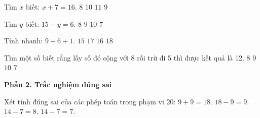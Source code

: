 \begin{ex} %
Tìm $x$ biết: $x + 7 = 16$.
\choice
{$8$}
{$10$}
{$11$}
{\True $9$}
\end{ex}

\begin{ex} %
Tìm $y$ biết: $15 - y = 6$.
\choice
{$8$}
{\True $9$}
{$10$}
{$7$}
\end{ex}

\begin{ex} %
Tính nhanh: $9 + 6 + 1$.
\choice
{$15$}
{$17$}
{\True $16$}
{$18$}
\end{ex}

\begin{ex} %
Tìm một số biết rằng lấy số đó cộng với 8 rồi trừ đi 5 thì được kết quả là 12.
\choice
{$8$}
{\True $9$}
{$10$}
{$7$}
\end{ex}

\textbf{Phần 2. Trắc nghiệm đúng sai}

\begin{ex} %
Xét tính đúng sai của các phép toán trong phạm vi 20:
\choiceTF
{\True $9 + 9 = 18$.}
{\True $18 - 9 = 9$.}
{$14 - 7 = 8$.}
{\True $14 - 7 = 7$.}
\end{ex}

